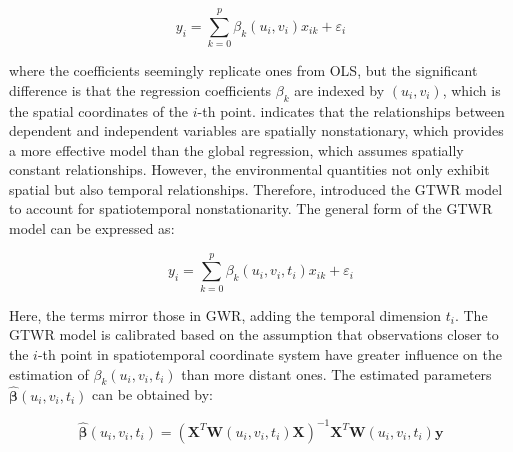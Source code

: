 \begin{equation}
y_i = \sum_{k=0}^{p} \beta_k(u_i, v_i) x_{ik} + \varepsilon_i
\label{eq:gwr}
\end{equation}




\noindent where the coefficients seemingly replicate ones from OLS, but the significant difference is that the regression coefficients \(\beta_k\) are indexed by \((u_i, v_i)\), which is the spatial coordinates of the \(i\)-th point.  indicates that the relationships between dependent and independent variables are spatially nonstationary, which provides a more effective model than the global regression, which assumes spatially constant relationships. However, the environmental quantities not only exhibit spatial but also temporal relationships. Therefore, \citet{huang2010geographically} introduced the GTWR model to account for spatiotemporal nonstationarity. The general form of the GTWR model can be expressed as:

\begin{equation}
y_i = \sum_{k=0}^{p} \beta_k(u_i, v_i, t_i) x_{ik} + \varepsilon_i
\label{eq:gtwr}
\end{equation}

Here, the terms mirror those in GWR, adding the temporal dimension $t_i$. The GTWR model is calibrated based on the assumption that observations closer to the $i$-th point in spatiotemporal coordinate system have greater influence on the estimation of $\beta_k(u_i, v_i, t_i)$ than more distant ones. The estimated parameters $\hat{\boldsymbol{\beta}}(u_i, v_i, t_i)$ can be obtained by:

\begin{equation}
\hat{\boldsymbol{\beta}}(u_i, v_i, t_i) = (\mathbf{X}^T\mathbf{W}(u_i, v_i, t_i)\mathbf{X})^{-1}\mathbf{X}^T\mathbf{W}(u_i, v_i, t_i) \mathbf{y}
\label{eq:coeff_gtwr}
\end{equation}

